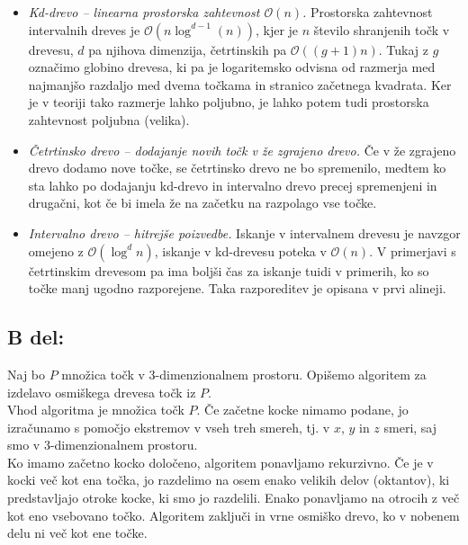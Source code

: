 \documentclass[a4paper,11pt]{article}
\begin{document}
\begin{itemize}
    \item \textit{Kd-drevo -- linearna prostorska zahtevnost $\mathcal{O}(n)$.} Prostorska zahtevnost intervalnih dreves je $\mathcal{O}(n \log^{d - 1}(n))$, kjer je $n$ število shranjenih točk v drevesu, $d$ pa njihova dimenzija, četrtinskih pa $\mathcal{O}((g + 1) n)$. Tukaj z $g$ označimo globino drevesa, ki pa je logaritemsko odvisna od razmerja med najmanjšo razdaljo med dvema točkama in stranico začetnega kvadrata. Ker je v teoriji tako razmerje lahko poljubno, je lahko potem tudi prostorska zahtevnost poljubna (velika). 
    \item \textit{Četrtinsko drevo -- dodajanje novih točk v že zgrajeno drevo.} Če v že zgrajeno drevo dodamo nove točke, se četrtinsko drevo ne bo spremenilo, medtem ko sta lahko po dodajanju kd-drevo in intervalno drevo precej spremenjeni in drugačni, kot če bi imela že na začetku na razpolago vse točke.
    \item \textit{Intervalno drevo -- hitrejše poizvedbe.} Iskanje v intervalnem drevesu je navzgor omejeno z $\mathcal{O}(\log^d n)$, iskanje v kd-drevesu poteka v $\mathcal{O}(n)$. V primerjavi s četrtinskim drevesom pa ima boljši čas za iskanje tuidi v primerih, ko so točke manj ugodno razporejene. Taka razporeditev je opisana v prvi alineji.
\end{itemize}
    
\subsection*{B del:}
Naj bo $P$ množica točk v $3$-dimenzionalnem prostoru. Opišemo algoritem za izdelavo osmiškega drevesa točk iz $P$.
\\
Vhod algoritma je množica točk $P$. Če začetne kocke nimamo podane, jo izračunamo s pomočjo ekstremov v vseh treh smereh, tj. v $x$, $y$ in $z$ smeri, saj smo v $3$-dimenzionalnem prostoru.
\\
Ko imamo začetno kocko določeno, algoritem ponavljamo rekurzivno. 
Če je v kocki več kot ena točka, jo razdelimo na osem enako velikih delov (oktantov), ki predstavljajo otroke kocke, ki smo jo razdelili.
Enako ponavljamo na otrocih z več kot eno vsebovano točko. Algoritem zaključi in vrne osmiško drevo, ko v nobenem delu ni več kot ene točke. 





\end{document}
